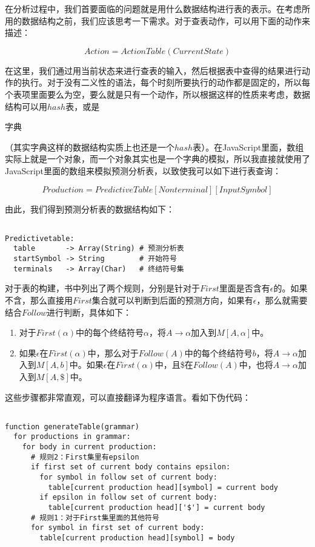 在分析过程中，我们首要面临的问题就是用什么数据结构进行表的表示。在考虑所用的数据结构之前，我们应该思考一下需求。对于查表动作，可以用下面的动作来描述：

\[
    Action = ActionTable(CurrentState)
\]

在这里，我们通过用当前状态来进行查表的输入，然后根据表中查得的结果进行动作的执行。对于没有二义性的语法，每个时刻所要执行的动作都是固定的，所以每个表项里面要么为空，要么就是只有一个动作，所以根据这样的性质来考虑，数据结构可以用$hash$表，或是\begin{bfseries}字典\end{bfseries}（其实字典这样的数据结构实质上也还是一个$hash$表）。在JavaScript里面，数组实际上就是一个对象，而一个对象其实也是一个字典的模拟，所以我直接就使用了JavaScript里面的数组来模拟预测分析表，以致使我可以如下进行表查询：

\[
    Production = PredictiveTable[Nonterminal][InputSymbol]
\]

由此，我们得到预测分析表的数据结构如下：

\begin{verbatim}

Predictivetable:
  table       -> Array(String) # 预测分析表 
  startSymbol -> String        # 开始符号 
  terminals   -> Array(Char)   # 终结符号集 

\end{verbatim}

对于表的构建，书中列出了两个规则，分别是针对于$First$里面是否含有$\epsilon$的。如果不含，那么直接用$First$集合就可以判断到后面的预测方向，如果有$\epsilon$，那么就需要结合$Follow$进行判断，具体如下：

\begin{enumerate}
    \item 对于$First(\alpha)$中的每个终结符号$\alpha$，将$A \rightarrow \alpha$加入到$M[A, \alpha]$中。
    \item 如果$\epsilon$在$First(\alpha)$中，那么对于$Follow(A)$中的每个终结符号$b$，将$A \rightarrow \alpha$加入到$M[A, b]$中。如果$\epsilon$在$First(\alpha)$中，且\$在$Follow(A)$中，也将$A \rightarrow \alpha$加入到$M[A, \$]$中。
\end{enumerate}

这些步骤都非常直观，可以直接翻译为程序语言。看如下伪代码：

\begin{verbatim}

function generateTable(grammar)
  for productions in grammar:
    for body in current production:
      # 规则2：First集里有epsilon
      if first set of current body contains epsilon:
        for symbol in follow set of current body:
          table[current production head][symbol] = current body
        if epsilon in follow set of current body:
          table[current production head]['$'] = current body
      # 规则1：对于First集里面的其他符号
      for symbol in first set of current body:
        table[current production head][symbol] = body

\end{verbatim}

